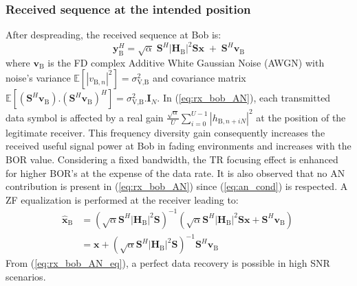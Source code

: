 \documentclass[journal,comsoc]{IEEEtran}
\newcommand{\module}[1]{\left|#1\right|}
\newcommand{\EX}[1]{\mathbb{E} \left[#1\right]}%
\newcommand{\HB}{\textbf{H}_{\text{B}}}
\newcommand{\spread}{\textbf{S}}
\begin{document}
\subsubsection{Received sequence at the intended position}
After despreading, the received sequence at Bob is: 
\begin{equation}
	\textbf{y}_{\text{B}}^H = \sqrt{\alpha} \; \spread^H \module{\HB}^2 \spread \textbf{x} \;  +  \;  \spread^H \textbf{v}_\text{B} 
	\label{eq:rx_bob_AN}
\end{equation}
where $\textbf{v}_\text{B}$ is the FD complex Additive White Gaussian Noise (AWGN) with noise's variance $\EX{|v_{\text{B},n}|^2}  = \sigma_{\text{V,B}}^2$ and covariance matrix $\EX{(\spread^H  \textbf{v}_\text{B}) . (\spread^H \textbf{v}_\text{B})^H} = \sigma_{\text{V,B}}^2 . \textbf{I}_N$. In (\ref{eq:rx_bob_AN}), each transmitted data symbol is affected by a real gain $ \frac{\sqrt{\alpha}}{U}\sum_{i=0}^{U-1} \left| h_{\text{B}, n + iN}\right|^2$ at the position of the legitimate receiver. This frequency diversity gain consequently increases the received useful signal power at Bob in fading environments and increases with the BOR value. Considering a fixed bandwidth, the TR focusing effect is enhanced for higher BOR's at the expense of the data rate. It is also observed that no AN contribution is present in (\ref{eq:rx_bob_AN}) since (\ref{eq:an_cond}) is respected. A ZF equalization is performed at the receiver leading to:
\begin{equation}
	\begin{split}
		\hat{\textbf{x}}_{\text{B}} &= \left( \sqrt{\alpha} \spread^H \module{\HB}^2 \spread \right)^{-1}  \left(\sqrt{\alpha}  \spread^H\module{\HB}^2 \spread \textbf{x}   +    \spread^H \textbf{v}_\text{B}\right) \\
		&= \textbf{x} + \left( \sqrt{\alpha} \spread^H \module{\HB}^2 \spread \right)^{-1} \spread^H \textbf{v}_\text{B}
	\end{split}
	\
	\label{eq:rx_bob_AN_eq}
\end{equation}
From (\ref{eq:rx_bob_AN_eq}), a perfect data recovery is possible in high SNR scenarios.



%
\end{document}
